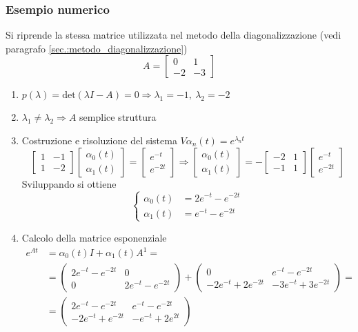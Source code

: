 \subsubsection{Esempio numerico}
Si riprende la stessa matrice utilizzata nel metodo della diagonalizzazione
(vedi paragrafo \ref{sec.:metodo_diagonalizzazione})
$$
A = \begin{bmatrix}
0 & 1\\
-2 & -3
\end{bmatrix}
$$
\begin{enumerate}
\item $p(\lambda) = \text{det} (\lambda I -A) = 0\Rightarrow \lambda_1 = -1,\
\lambda_2 = -2$
\item $\lambda_1\neq \lambda_2 \Rightarrow A $ semplice struttura
\item Costruzione e risoluzione del sistema $V\alpha_n(t) = e^{\lambda_n t}$
$$
\begin{bmatrix}
1 & -1 \\
1 & -2
\end{bmatrix}\begin{bmatrix}
\alpha_0(t) \\ \alpha_1 (t)
\end{bmatrix} =
\begin{bmatrix}
e^{-t} \\
e^{-2t}
\end{bmatrix}\Rightarrow \begin{bmatrix}
\alpha_0(t) \\ \alpha_1 (t)
\end{bmatrix} = - \begin{bmatrix}
-2 & 1 \\
-1 & 1
\end{bmatrix}\begin{bmatrix}
e^{-t} \\ e^{-2t}
\end{bmatrix}
$$
Sviluppando si ottiene
$$\left\{\begin{aligned}
\alpha_0(t) &= 2e^{-t} - e^{-2t}\\
\alpha_1(t) &= e^{-t} -e^{-2t}
\end{aligned}\right.$$
\item Calcolo della matrice esponenziale
$$\begin{aligned}
e^{At} &= \alpha_0(t)I + \alpha_1(t) A^1 =\\
&=\begin{pmatrix}
2e^{-t}-e^{-2t} & 0 \\
0 & 2e^{-t}-e^{-2t}
\end{pmatrix} + \begin{pmatrix}
0 & e^{-t}-e^{-2t} \\
-2e^{-t}+2e^{-2t} & -3e^{-t} + 3e^{-2t}
\end{pmatrix} =\\
&= \begin{pmatrix}
2e^{-t}-e^{-2t} & e^{-t}-e^{-2t}\\
-2e^{-t} + e^{-2t} & -e^{-t}+2e^{2t}
\end{pmatrix}
\end{aligned}$$
\end{enumerate}

